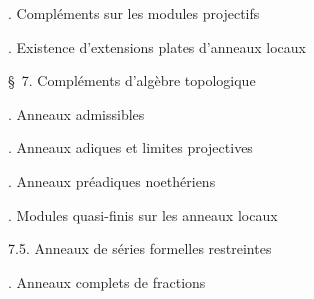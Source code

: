 \noindent{}. Compléments sur les modules projectifs\dotfill

\noindent{}. Existence d'extensions plates d'anneaux locaux\dotfill

\noindent\quad {}

\noindent\quad \S\ 7. Compléments d'algèbre topologique\dotfill

\noindent{}. Anneaux admissibles\dotfill

\noindent{}. Anneaux adiques et limites projectives\dotfill

\noindent{}. Anneaux préadiques noethériens\dotfill

\noindent{}. Modules quasi-finis sur les anneaux locaux\dotfill

\noindent\qquad {} 7.5. Anneaux de séries formelles restreintes\dotfill

\noindent{}. Anneaux complets de fractions\dotfill

